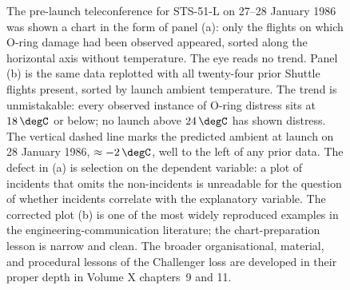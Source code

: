 \begin{figure}[htbp]
{\begin{tikzpicture}
\end{tikzpicture}%
}%
\caption[The Challenger pre-launch chart: incidents only vs all
flights]{The pre-launch teleconference for STS-51-L on 27--28
January 1986 was shown a chart in the form of panel (a): only the
flights on which O-ring damage had been observed appeared, sorted
along the horizontal axis without temperature. The eye reads no
trend. Panel (b) is the same data replotted with all twenty-four
prior Shuttle flights present, sorted by launch ambient temperature.
The trend is unmistakable: every observed instance of O-ring distress
sits at $18\,\degC$ or below; no launch above $24\,\degC$ has shown
distress. The vertical dashed line marks the predicted ambient at
launch on 28 January 1986, $\approx -2\,\degC$, well to the left of
any prior data. The defect in (a) is selection on the dependent
variable: a plot of incidents that omits the non-incidents is
unreadable for the question of whether incidents correlate with the
explanatory variable. The corrected plot (b) is one of the most
widely reproduced examples in the engineering-communication
literature; the chart-preparation lesson is narrow and clean. The
broader organisational, material, and procedural lessons of the
Challenger loss are developed in their proper depth in Volume X
chapters~9 and 11.}
\label{fig:vol02:ch02:challenger-chart}
\end{figure}
